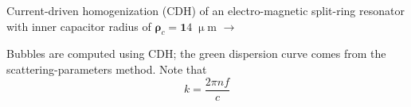 \documentclass[t]{beamer} \usepackage[english]{babel} \usepackage[utf8]{inputenc} \usetheme{Frankfurt} %
\begin{document}
\begin{frame}[plain]{}%
\begin{columns}[T] %
	\begin{column}{.55\textwidth}
	\vspace{3mm}
	\noindent Current-driven homogenization (CDH) of an electro-magnetic split-ring resonator with inner capacitor radius of $\pmb\rho_c=\pmb 14\;\upmu$m $\rightarrow$
	\vspace{3mm}

	\noindent Bubbles are computed using CDH; the green dispersion curve comes from the scattering-parameters method. Note that $$k = \frac{2\pi n f}{c}$$
	\vspace{5mm}


\end{column}
\end{columns}
\end{frame}
\end{document}
